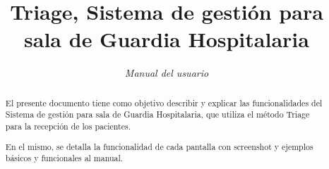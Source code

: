 \documentclass[a4paper,10pt]{article}
\title{Triage, Sistema de gestión para sala de Guardia Hospitalaria}
\author{\textit{Manual del usuario}}
\begin{document}
\maketitle
\newpage 

\begin{abstract}
El presente documento tiene como objetivo describir y explicar las funcionalidades del Sistema de gestión para sala de Guardia Hospitalaria, que utiliza el método Triage para la recepción de los pacientes.

En el mismo, se detalla la funcionalidad de cada pantalla con screenshot y ejemplos básicos y funcionales al manual.

\end{abstract}


\newpage 
\tableofcontents

\newpage














\end{document}

